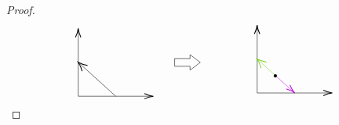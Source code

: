 \documentclass{article}
\begin{document}
\begin{proof}
\[\begin{tikzpicture}[x=0.75pt,y=0.75pt,yscale=-1,xscale=1]
        \draw [color={rgb, 255:red, 189; green, 16; blue, 224 }  ,draw opacity=1 ][fill={rgb, 255:red, 189; green, 16; blue, 224 }  ,fill opacity=1 ]   (422.81,125.53) -- (444.14,145.04) ;
        \draw [shift={(445.62,146.39)}, rotate = 222.45] [color={rgb, 255:red, 189; green, 16; blue, 224 }  ,draw opacity=1 ][line width=0.75]    (10.93,-3.29) .. controls (6.95,-1.4) and (3.31,-0.3) .. (0,0) .. controls (3.31,0.3) and (6.95,1.4) .. (10.93,3.29)   ;
        \draw    (183,150.39) -- (183,68.94) ;
        \draw [shift={(183,66.94)}, rotate = 90] [color={rgb, 255:red, 0; green, 0; blue, 0 }  ][line width=0.75]    (10.93,-3.29) .. controls (6.95,-1.4) and (3.31,-0.3) .. (0,0) .. controls (3.31,0.3) and (6.95,1.4) .. (10.93,3.29)   ;
        \draw    (183,150.39) -- (272.24,150.39) ;
        \draw [shift={(274.24,150.39)}, rotate = 180] [color={rgb, 255:red, 0; green, 0; blue, 0 }  ][line width=0.75]    (10.93,-3.29) .. controls (6.95,-1.4) and (3.31,-0.3) .. (0,0) .. controls (3.31,0.3) and (6.95,1.4) .. (10.93,3.29)   ;
        \draw [color={rgb, 255:red, 0; green, 0; blue, 0 }  ,draw opacity=1 ]   (184.48,110.01) -- (228.62,150.39) ;
        \draw [shift={(183,108.66)}, rotate = 42.45] [color={rgb, 255:red, 0; green, 0; blue, 0 }  ,draw opacity=1 ][line width=0.75]    (10.93,-4.9) .. controls (6.95,-2.3) and (3.31,-0.67) .. (0,0) .. controls (3.31,0.67) and (6.95,2.3) .. (10.93,4.9)   ;
        \draw   (300,104.06) -- (318.67,104.06) -- (318.67,99.31) -- (331.11,108.81) -- (318.67,118.31) -- (318.67,113.56) -- (300,113.56) -- cycle ;
        \draw    (400,146.39) -- (400,64.94) ;
        \draw [shift={(400,62.94)}, rotate = 90] [color={rgb, 255:red, 0; green, 0; blue, 0 }  ][line width=0.75]    (10.93,-3.29) .. controls (6.95,-1.4) and (3.31,-0.3) .. (0,0) .. controls (3.31,0.3) and (6.95,1.4) .. (10.93,3.29)   ;
        \draw    (400,146.39) -- (489.24,146.39) ;
        \draw [shift={(491.24,146.39)}, rotate = 180] [color={rgb, 255:red, 0; green, 0; blue, 0 }  ][line width=0.75]    (10.93,-3.29) .. controls (6.95,-1.4) and (3.31,-0.3) .. (0,0) .. controls (3.31,0.3) and (6.95,1.4) .. (10.93,3.29)   ;
        \draw [color={rgb, 255:red, 126; green, 211; blue, 33 }  ,draw opacity=1 ]   (401.48,106.01) -- (422.81,125.53) ;
        \draw [shift={(400,104.66)}, rotate = 42.45] [color={rgb, 255:red, 126; green, 211; blue, 33 }  ,draw opacity=1 ][line width=0.75]    (10.93,-4.9) .. controls (6.95,-2.3) and (3.31,-0.67) .. (0,0) .. controls (3.31,0.67) and (6.95,2.3) .. (10.93,4.9)   ;
        \draw  [line width=3] [line join = round][line cap = round] (422.11,125.31) .. controls (422.11,125.31) and (422.11,125.31) .. (422.11,125.31) ;
        

\end{tikzpicture}\]
\end{proof}
\end{document}
